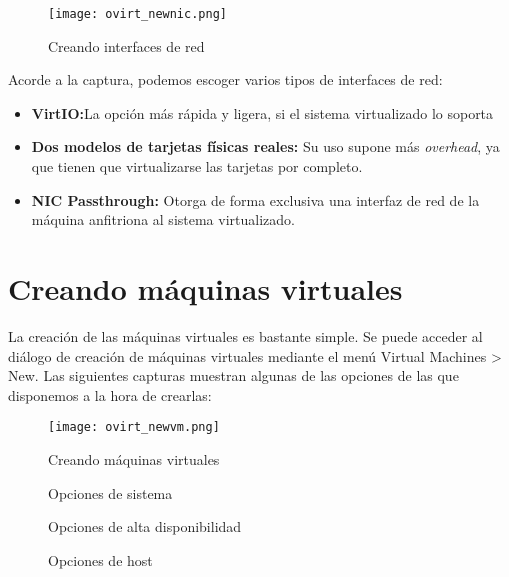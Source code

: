 \begin{figure}[ht!]
  \centering
  \texttt{[image: ovirt\_newnic.png]}
  \caption{\label{fig:create_nic} Creando interfaces de red}
\end{figure}

Acorde a la captura, podemos escoger varios tipos de interfaces de red:

\begin{itemize}
    \item \textbf{VirtIO:\@ }La opción más rápida y ligera, si el sistema virtualizado lo soporta
    \item \textbf{Dos modelos de tarjetas físicas reales: }Su uso supone más \emph{overhead}, ya que tienen que virtualizarse las tarjetas por completo.
    \item \textbf{NIC Passthrough: }Otorga de forma exclusiva una interfaz de red de la máquina anfitriona al sistema virtualizado.
\end{itemize}

\clearpage

\section{Creando máquinas virtuales}
\label{sec:creando_vms}

La creación de las máquinas virtuales es bastante simple. Se puede acceder al diálogo de creación de máquinas virtuales mediante el menú Virtual Machines > New. Las siguientes capturas muestran algunas de las opciones de las que disponemos a la hora de crearlas:

\begin{figure}[ht!]
  \centering
  \texttt{[image: ovirt\_newvm.png]}
  \caption{\label{fig:create_vms} Creando máquinas virtuales}
\end{figure}

\begin{figure}[ht!]
  \centering
  \caption{\label{fig:vmsys} Opciones de sistema}
\end{figure}

\begin{figure}[ht!]
  \centering
  \caption{\label{fig:vmha} Opciones de alta disponibilidad}
\end{figure}

\begin{figure}[ht!]
  \centering
  \caption{\label{fig:vmhost} Opciones de host}
\end{figure}

